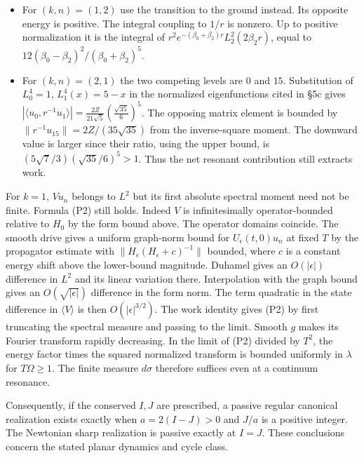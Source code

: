 \documentclass[11pt,a4paper]{article}
\newcommand{\tightlist}{\setlength{\itemsep}{0pt}\setlength{\parskip}{0pt}}
\begin{document}
\begin{itemize}
\tightlist
\item
  For \((k,n)=(1,2)\) use the transition to the ground instead. Its
  opposite energy is positive. The integral coupling to \(1/r\) is
  nonzero. Up to positive normalization it is the integral of
  \(r^2 e^{-(\beta_0+\beta_2)r} L_2^2(2\beta_2r)\), equal to
  \(12(\beta_0-\beta_2)^2/(\beta_0+\beta_2)^5\).
\item
  For \((k,n)=(2,1)\) the two competing levels are \(0\) and \(15\).
  Substitution of \(L_0^4=1\), \(L_1^4(x)=5-x\) in the normalized
  eigenfunctions cited in §5c gives \(|\langle u_0,r^{-1}u_1\rangle|=
  \frac{2Z}{21\sqrt5}\left(\frac{\sqrt{35}}6\right)^5\). The opposing
  matrix element is bounded by \(\|r^{-1}u_{15}\|=2Z/(35\sqrt{35})\)
  from the inverse-square moment. The downward value is larger since
  their ratio, using the upper bound, is
  \((5\sqrt7/3)(\sqrt{35}/6)^5>1\). Thus the net resonant contribution
  still extracts work.
\end{itemize}

For \(k=1\), \(Vu_n\) belongs to \(L^2\) but its first absolute spectral
moment need not be finite. Formula (P2) still holds. Indeed \(V\) is
infinitesimally operator-bounded relative to \(H_0\) by the form bound
above. The operator domains coincide. The smooth drive gives a uniform
graph-norm bound for \(U_\epsilon(t,0)u_n\) at fixed \(T\) by the
propagator estimate with \(\|\dot H_\epsilon(H_\epsilon+c)^{-1}\|\)
bounded, where \(c\) is a constant energy shift above the lower-bound
magnitude. Duhamel gives an \(O(|\epsilon|)\) difference in \(L^2\) and
its linear variation there. Interpolation with the graph bound gives an
\(O(\sqrt{|\epsilon|})\) difference in the form norm. The term quadratic
in the state difference in \(\langle V\rangle\) is then
\(O(|\epsilon|^{3/2})\). The work identity gives (P2) by first
truncating the spectral measure and passing to the limit. Smooth \(g\)
makes its Fourier transform rapidly decreasing. In the limit of (P2)
divided by \(T^2\), the energy factor times the squared normalized
transform is bounded uniformly in \(\lambda\) for \(T\Omega\ge1\). The
finite measure \(d\sigma\) therefore suffices even at a continuum
resonance.

Consequently, if the conserved \(I,J\) are prescribed, a passive regular
canonical realization exists exactly when \(a=2(I-J)>0\) and \(J/a\) is
a positive integer. The Newtonian sharp realization is passive exactly
at \(I=J\). These conclusions concern the stated planar dynamics and
cycle class.
\end{document}
